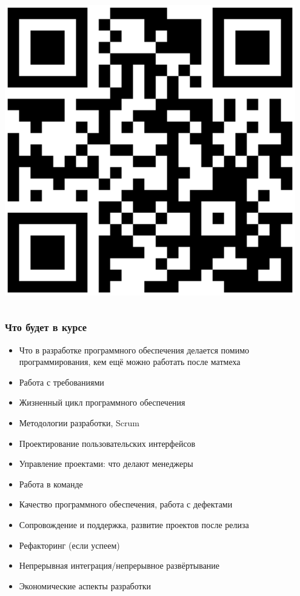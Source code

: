 \documentclass{../../slides-style}
\begin{document}
\begin{frame}
\begin{columns}
\begin{column}{0.3\textwidth}
\begin{center}
                    \includegraphics[width=0.95\textwidth]{courseLink2025.png}
                \end{center}
            \end{column}
        \end{columns}
    \end{frame}

    \begin{frame}
        \frametitle{Что будет в курсе}
        \begin{itemize}
            \item Что в разработке программного обеспечения делается помимо программирования, кем ещё можно работать после матмеха
            \item Работа с требованиями
            \item Жизненный цикл программного обеспечения
            \item Методологии разработки, Scrum
            \item Проектирование пользовательских интерфейсов
            \item Управление проектами: что делают менеджеры
            \item Работа в команде
            \item Качество программного обеспечения, работа с дефектами
            \item Сопровождение и поддержка, развитие проектов после релиза
            \item Рефакторинг (если успеем)
            \item Непрерывная интеграция/непрерывное развёртывание
            \item Экономические аспекты разработки
        \end{itemize}
    \end{frame}
\end{document}
